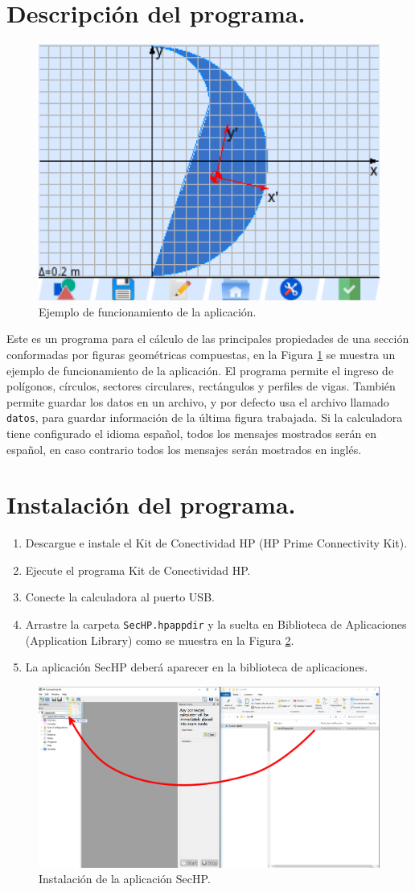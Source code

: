 \documentclass[spanish,xcolor=pdftex,dvipsnames,table,mathserif]{scrartcl}
\begin{document}
\section{Descripción del programa.}
\begin{figure}[H]
	\centering
	\caption{Ejemplo de funcionamiento de la aplicación.}
	\label{fig:ejemplo}
	\includegraphics[width=0.5\linewidth]{imagenes/ejemplo}
\end{figure}

Este es un programa para el cálculo de las principales propiedades de una sección conformadas por figuras geométricas compuestas, en la Figura \ref{fig:ejemplo} se muestra un ejemplo de funcionamiento de la aplicación. El programa permite el ingreso de polígonos, círculos, sectores circulares, rectángulos y perfiles de vigas. También permite guardar los datos en un archivo, y por defecto usa el archivo llamado \verb|datos|, para guardar información de la última figura trabajada. Si la calculadora tiene configurado el idioma español, todos los mensajes mostrados serán en español, en caso contrario todos los mensajes serán mostrados en inglés.
\section{Instalación del programa.}
\begin{enumerate}
	\item Descargue e instale el Kit de Conectividad HP (HP Prime Connectivity Kit).
	\item Ejecute el programa Kit de Conectividad HP.
	\item Conecte la calculadora al puerto USB.
	\item Arrastre la carpeta \verb|SecHP.hpappdir| y la suelta en Biblioteca de Aplicaciones (Application Library) como se muestra en la Figura \ref{fig:instalacion}.
	\item La aplicación SecHP deberá aparecer en la biblioteca de aplicaciones.
\end{enumerate}
\begin{figure}[H]
	\centering
	\caption{Instalación de la aplicación SecHP.}
	\label{fig:instalacion}
	\includegraphics[width=0.7\linewidth]{imagenes/instalacion}	
\end{figure}
\end{document}
